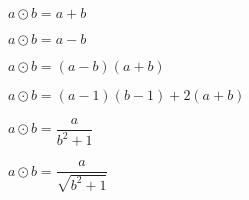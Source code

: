 \begin{multicols}{2}
\begin{chapex}
\label{cqClosureOfNumberSetsBegin}
$a \odot b = a + b$
\end{chapex}

\begin{chapex}
$a \odot b = a - b$
\end{chapex}

\begin{chapex}
$a \odot b = (a-b)(a+b)$
\end{chapex}

\begin{chapex}
$a \odot b = (a-1)(b-1) + 2(a+b)$
\end{chapex}

\begin{chapex}
$a \odot b = \dfrac{a}{b^2+1}$
\end{chapex}

\begin{chapex}
\label{cqClosureOfNumberSetsEnd}
$a \odot b = \dfrac{a}{\sqrt{b^2+1}}$
\end{chapex}

\end{multicols}

%
%
%
%

